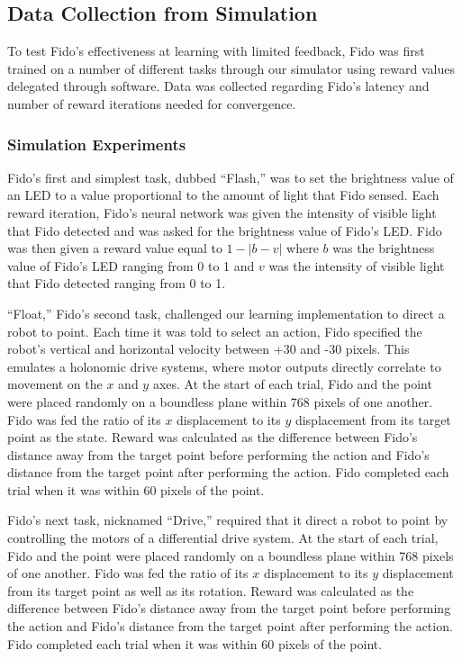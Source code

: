 \subsection{Data Collection from Simulation}

To test Fido's effectiveness at learning with limited feedback, Fido was first trained on a number of different tasks through our simulator using reward values delegated through software.
Data was collected regarding Fido's latency and number of reward iterations needed for convergence.

\subsubsection{Simulation Experiments}

Fido's first and simplest task, dubbed ``Flash,'' was to set the brightness value of an LED to a value proportional to the amount of light that Fido sensed.
Each reward iteration, Fido's neural network was given the intensity of visible light that Fido detected and was asked for the brightness value of Fido's LED.
Fido was then given a reward value equal to $1 - |b - v|$ where $b$ was the brightness value of Fido's LED ranging from 0 to 1 and $v$ was the intensity of visible light that Fido detected ranging from 0 to 1.

``Float,'' Fido's second task, challenged our learning implementation to direct a robot to point.
Each time it was told to select an action, Fido specified the robot's vertical and horizontal velocity between +30 and -30 pixels.
This emulates a holonomic drive systems, where motor outputs directly correlate to movement on the $x$ and $y$ axes.
At the start of each trial, Fido and the point were placed randomly on a boundless plane within 768 pixels of one another.
Fido was fed the ratio of its $x$ displacement to its $y$ displacement from its target point as the state.
Reward was calculated as the difference between Fido's distance away from the target point before performing the action and Fido's distance from the target point after performing the action.
Fido completed each trial when it was within 60 pixels of the point.

Fido's next task, nicknamed ``Drive,'' required that it direct a robot to point by controlling the motors of a differential drive system.
At the start of each trial, Fido and the point were placed randomly on a boundless plane within 768 pixels of one another.
Fido was fed the ratio of its $x$ displacement to its $y$ displacement from its target point as well as its rotation.
Reward was calculated as the difference between Fido's distance away from the target point before performing the action and Fido's distance from the target point after performing the action.
Fido completed each trial when it was within 60 pixels of the point.

